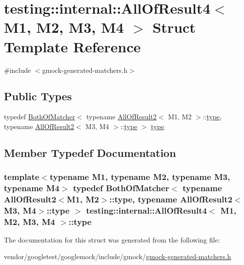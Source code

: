 \hypertarget{structtesting_1_1internal_1_1AllOfResult4}{}\section{testing\+:\+:internal\+:\+:All\+Of\+Result4$<$ M1, M2, M3, M4 $>$ Struct Template Reference}
\label{structtesting_1_1internal_1_1AllOfResult4}


{\ttfamily \#include $<$gmock-\/generated-\/matchers.\+h$>$}

\subsection*{Public Types}
\begin{DoxyCompactItemize}
\item 
typedef \hyperlink{classtesting_1_1internal_1_1BothOfMatcher}{Both\+Of\+Matcher}$<$ typename \hyperlink{structtesting_1_1internal_1_1AllOfResult2}{All\+Of\+Result2}$<$ M1, M2 $>$\+::\hyperlink{structtesting_1_1internal_1_1AllOfResult4_ab277e20178bac632d4e5a39a1a407bbf}{type}, typename \hyperlink{structtesting_1_1internal_1_1AllOfResult2}{All\+Of\+Result2}$<$ M3, M4 $>$\+::\hyperlink{structtesting_1_1internal_1_1AllOfResult4_ab277e20178bac632d4e5a39a1a407bbf}{type} $>$ \hyperlink{structtesting_1_1internal_1_1AllOfResult4_ab277e20178bac632d4e5a39a1a407bbf}{type}
\end{DoxyCompactItemize}


\subsection{Member Typedef Documentation}
\subsubsection[{\texorpdfstring{type}{type}}]{\setlength{\rightskip}{0pt plus 5cm}template$<$typename M1, typename M2, typename M3, typename M4$>$ typedef {\bf Both\+Of\+Matcher}$<$ typename {\bf All\+Of\+Result2}$<$M1, M2$>$\+::{\bf type}, typename {\bf All\+Of\+Result2}$<$M3, M4$>$\+::{\bf type} $>$ {\bf testing\+::internal\+::\+All\+Of\+Result4}$<$ M1, M2, M3, M4 $>$\+::{\bf type}}\hypertarget{structtesting_1_1internal_1_1AllOfResult4_ab277e20178bac632d4e5a39a1a407bbf}{}\label{structtesting_1_1internal_1_1AllOfResult4_ab277e20178bac632d4e5a39a1a407bbf}


The documentation for this struct was generated from the following file\+:\begin{DoxyCompactItemize}
\item 
vendor/googletest/googlemock/include/gmock/\hyperlink{gmock-generated-matchers_8h}{gmock-\/generated-\/matchers.\+h}\end{DoxyCompactItemize}
